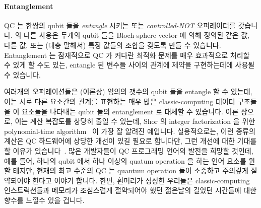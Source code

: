 \paragraph{Entanglement}

QC 는 한쌍의 qubit 들을 \emph{entangle} 시키는  또는
\emph{controlled-NOT} 오퍼레이터를 갖습니다.
 의 다른 사용은 두개의 qubit 들을 Bloch-sphere vector 에 의해 정의된
같은 값, 다른 값, 또는 (대충 말해서) 특정 값들의 조합을 갖도록 만들 수
있습니다.
Entanglement 는 잠재적으로 QC 가 커다란 최적화 문제를 매우 효과적으로 처리할 수
있게 할 수도 있는, entangle 된 변수들 사이의 관계에 제약을 구현하는데에 사용될
수 있습니다.

여러개의  오퍼레이션들은 (이론상) 임의의 갯수의 qubit 들을 entangle
할 수 있는데, 이는 서로 다른 요소간의 관계를 표현하는 매우 많은
classic-computing 데이터 구조들을 이 요소들을 나타내는 qubit 들의 entanglement
로 대체할 수 있습니다.
이론 상으로, 이는 계산 복잡도를 상당히 줄일 수 있는데, Shor 의 integer
factorization 을 위한 polynomial-time
algorithm~\cite{Shor:1997:PAP:264393.264406} 이 가장 잘 알려진 예입니다.
실용적으로는, 이런 종류의 계산은 QC 하드웨어에 상당한 개선이 있길 필요로
합니다만, 그런 개선에 대한 기대를 할 이유가
있습니다~\cite{RobertMcConnell2015QC-Entangle3000Atoms}.
많은 개발자들이 QC 프로그래밍 언어의 발전을 희망할 것인데, 예를 들어, 하나의
qubit 에서 하나 이상의 quatum operation 을 하는 언어 요소를 원할 테지만, 현재의
최고 수준의 QC 는 quantum operation 들이 소중하고 주의깊게 절약되어야 한다고
이야기 합니다.
한편, 흰머리가 성성한 우리들은 classic-computing 인스트럭션들과 메모리가
조심스럽게 절약되어야 했던 젊은날의 길었던 시간들에 대한 향수를 느낄수 있을
겁니다.
\iffalse

